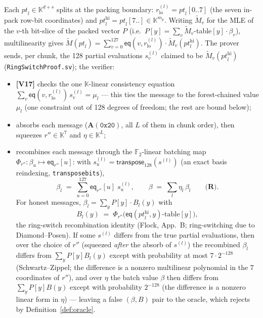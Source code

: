 \documentclass[11pt]{article}
\newcommand{\F}{\mathbb{F}}
\newcommand{\K}{\mathbb{K}}            %
\newcommand{\Ftwo}{\F_2}
\newcommand{\mle}[1]{\widetilde{#1}}
\newcommand{\eq}{\mathsf{eq}}
\newcommand{\code}[1]{{\def\_{\textunderscore\allowbreak}\texttt{#1}}}
\newcommand{\Vc}[1]{\textbf{[V#1]}}    %
\begin{document}
Each $\mathit{pt}_l \in \K^{d+s}$ splits at the packing boundary:
$r_{\mathrm{lo}}^{(l)} = \mathit{pt}_l[0..7]$ (the seven in-pack row-bit
coordinates) and $\mathit{pt}_l^{\mathrm{hi}} = \mathit{pt}_l[7..] \in
\K^{m_p}$.  Writing $\mle{M}_v$ for the MLE of the $v$-th bit-slice of the
packed vector $P$ (i.e.\ $P[y] = \sum_v \mle{M}_v$-table$[y]\cdot\beta_v$),
multilinearity gives
$\mle{M}(\mathit{pt}_l) = \sum_{v=0}^{127}
 \eq(v, r_{\mathrm{lo}}^{(l)})\cdot \mle{M}_v(\mathit{pt}_l^{\mathrm{hi}})$.
The prover sends, per chunk, the 128 partial evaluations
$s^{(l)}_v$ claimed to be $\mle{M}_v(\mathit{pt}_l^{\mathrm{hi}})$
(\code{RingSwitchProof.s\_v}); the verifier:
\begin{itemize}[itemsep=1pt]
\item \Vc{17} checks the one $\K$-linear consistency equation
  $\sum_v \eq(v, r_{\mathrm{lo}}^{(l)})\, s^{(l)}_v = \mu_l$ — this ties
  the message to the forest-chained value $\mu_l$ (one constraint out of
  128 degrees of freedom; the rest are bound below);
\item absorbs each message
  ($\mathbf{A}(\mathtt{0x20})$, all $L$ of them in chunk order), then
  squeezes $r'' \in \K^7$ and $\eta \in \K^L$;
\item recombines each message through the $\Ftwo$-linear batching map
  $\Phi_{r''}\colon \beta_u \mapsto \eq_{r''}[u]$: with
  $s_u^{(l)} = \mathsf{transpose}_{128}(s^{(l)})$ (an exact basis
  reindexing, \code{transpose\_bits\_128}),
  \[
    \beta_l \;=\; \sum_{u=0}^{127} \eq_{r''}[u]\; s_u^{(l)},
    \qquad
    \beta \;=\; \sum_{l} \eta_l\, \beta_l \qquad \textbf{(R)} .
  \]
  For honest messages, $\beta_l = \sum_y P[y]\cdot B_l(y)$ with
  \[
    B_l(y) \;=\; \Phi_{r''}\!\big(\eq(\mathit{pt}_l^{\mathrm{hi}},
    y)\text{-table}[y]\big),
  \]
  the ring-switch recombination identity (Flock, App.~B; ring-switching
  due to Diamond--Posen).  If some $s^{(l)}$ differs from the true partial
  evaluations, then over the choice of $r''$ (squeezed \emph{after} the
  absorb of $s^{(l)}$) the recombined $\beta_l$ differs from
  $\sum_y P[y] B_l(y)$ except with probability at most $7 \cdot 2^{-128}$
  (Schwartz--Zippel; the difference is a nonzero multilinear polynomial in
  the $7$ coordinates of $r''$), and over $\eta$ the batch value $\beta$
  then differs from $\sum_y P[y] B(y)$ except with probability
  $2^{-128}$ (the difference is a nonzero linear form in $\eta$) —
  leaving a false $(\beta, B)$ pair to the oracle, which rejects by
  Definition~\ref{def:oracle}.
\end{itemize}
\end{document}
